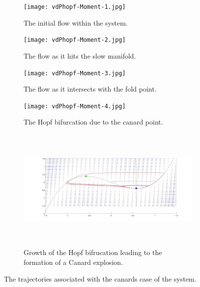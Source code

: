 \begin{figure}[h!]
	\centering
	\begin{subfigure}[t]{0.45\textwidth}
		\centering
		\texttt{[image: vdPhopf-Moment-1.jpg]}
		\caption{The initial flow within the system.} \label{fig:timing1}
	\end{subfigure}
	\hfill
	\begin{subfigure}[t]{0.45\textwidth}
		\centering
		\texttt{[image: vdPhopf-Moment-2.jpg]}
		\caption{The flow as it hits the slow manifold.} \label{fig:timing2}
	\end{subfigure}
	
	\vspace{1cm}
	\begin{subfigure}[t]{0.45\textwidth}
		\centering
		\texttt{[image: vdPhopf-Moment-3.jpg]}
		\caption{The flow as it intersects with the fold point.} \label{fig:timing3}
	\end{subfigure}
	\hfill
	\begin{subfigure}[t]{0.45\textwidth}\centering
		\texttt{[image: vdPhopf-Moment-4.jpg]}
		\caption{The Hopf bifurcation due to the canard point.}\label{fig:timing4}
	\end{subfigure}\vspace{1cm}
	\begin{subfigure}[t]{0.45\textwidth}\centering
		\includegraphics[width=.8\linewidth, height=6cm]{Code/behaviourswitch-pres}
		\caption{Growth of the Hopf bifrucation leading to the formation of a Canard explosion.}
		\label{fig: hopf growth}
	\end{subfigure}
	\caption{The trajectories associated with the canards case of the \vdp system.}
	\label{fig: 4 canard }
\end{figure}\newpage
